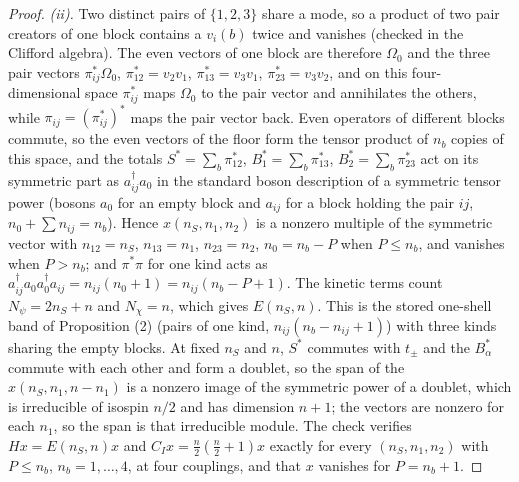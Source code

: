 \begin{proof}
\emph{(ii).} Two distinct pairs of $\{1, 2, 3\}$ share a mode, so a product of two pair creators of one block contains a $v_{i}(b)$ twice and vanishes (checked in the Clifford algebra). The even vectors of one block are therefore $\Omega_{0}$ and the three pair vectors $\pi_{ij}^{*}\Omega_{0}$, $\pi_{12}^{*} = v_{2}v_{1}$, $\pi_{13}^{*} = v_{3}v_{1}$, $\pi_{23}^{*} = v_{3}v_{2}$, and on this four-dimensional space $\pi_{ij}^{*}$ maps $\Omega_{0}$ to the pair vector and annihilates the others, while $\pi_{ij} = (\pi_{ij}^{*})^{*}$ maps the pair vector back. Even operators of different blocks commute, so the even vectors of the floor form the tensor product of $n_{b}$ copies of this space, and the totals $S^{*} = \sum_{b}\pi_{12}^{*}$, $B_{1}^{*} = \sum_{b}\pi_{13}^{*}$, $B_{2}^{*} = \sum_{b}\pi_{23}^{*}$ act on its symmetric part as $a_{ij}^{\dagger}a_{0}$ in the standard boson description of a symmetric tensor power (bosons $a_{0}$ for an empty block and $a_{ij}$ for a block holding the pair $ij$, $n_{0} + \sum n_{ij} = n_{b}$). Hence $x(n_{S}, n_{1}, n_{2})$ is a nonzero multiple of the symmetric vector with $n_{12} = n_{S}$, $n_{13} = n_{1}$, $n_{23} = n_{2}$, $n_{0} = n_{b} - P$ when $P \le n_{b}$, and vanishes when $P > n_{b}$; and $\pi^{*}\pi$ for one kind acts as $a_{ij}^{\dagger}a_{0}a_{0}^{\dagger}a_{ij} = n_{ij}(n_{0} + 1) = n_{ij}(n_{b} - P + 1)$. The kinetic terms count $N_{\psi} = 2n_{S} + n$ and $N_{\chi} = n$, which gives $E(n_{S}, n)$. This is the stored one-shell band of Proposition (2) (pairs of one kind, $n_{ij}(n_{b} - n_{ij} + 1)$) with three kinds sharing the empty blocks. At fixed $n_{S}$ and $n$, $S^{*}$ commutes with $t_{\pm}$ and the $B_{\alpha}^{*}$ commute with each other and form a doublet, so the span of the $x(n_{S}, n_{1}, n - n_{1})$ is a nonzero image of the symmetric power of a doublet, which is irreducible of isospin $n/2$ and has dimension $n + 1$; the vectors are nonzero for each $n_{1}$, so the span is that irreducible module. The check verifies $Hx = E(n_{S}, n)x$ and $C_{I}x = \tfrac{n}{2}(\tfrac{n}{2} + 1)x$ exactly for every $(n_{S}, n_{1}, n_{2})$ with $P \le n_{b}$, $n_{b} = 1, \ldots, 4$, at four couplings, and that $x$ vanishes for $P = n_{b} + 1$.


\end{proof}
